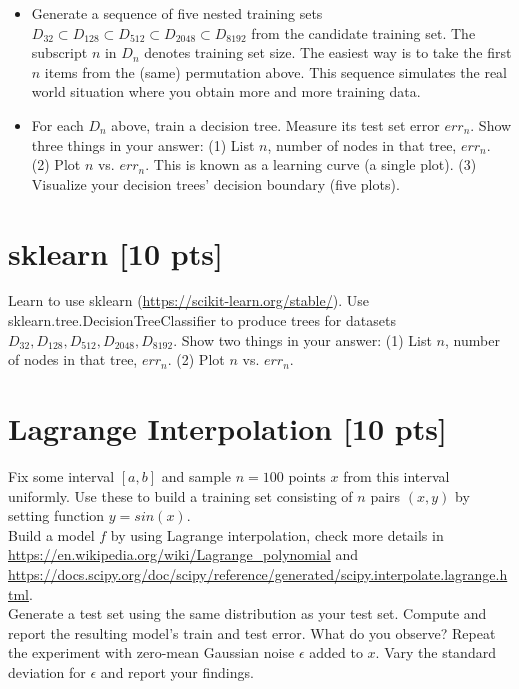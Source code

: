 \documentclass[letter]{article}
\theoremstyle{definition}
\begin{document}
\begin{enumerate}
\begin{itemize}
  \item Generate a sequence of five nested training sets $D_{32} \subset D_{128} \subset D_{512} \subset D_{2048} \subset D_{8192}$ from the candidate training set.  The subscript $n$ in $D_n$ denotes training set size.  The easiest way is to take the first $n$ items from the (same) permutation above.  This sequence simulates the real world situation where you obtain more and more training data.
  
  \item For each $D_n$ above, train a decision tree.  Measure its test set error $err_n$.  Show three things in your answer: (1) List $n$, number of nodes in that tree, $err_n$. (2) Plot $n$ vs. $err_n$.  This is known as a learning curve (a single plot). (3) Visualize your decision trees' decision boundary (five plots). \\
  \end{itemize}
  
\end{enumerate}

\section{sklearn [10 pts]}
Learn to use sklearn (\url{https://scikit-learn.org/stable/}).
Use sklearn.tree.DecisionTreeClassifier to produce trees for datasets $D_{32}, D_{128}, D_{512}, D_{2048}, D_{8192}$.  Show two things in your answer: (1) List $n$, number of nodes in that tree, $err_n$. (2) Plot $n$ vs. $err_n$.

\section{Lagrange Interpolation [10 pts]}
Fix some interval $[a, b]$ and sample $n = 100$ points $x$ from this interval uniformly. Use these to build a training set consisting of $n$ pairs $(x, y)$ by setting function $y = sin(x)$. \\

Build a model $f$ by using Lagrange interpolation, check more details in \url{https://en.wikipedia.org/wiki/Lagrange_polynomial} and \url{https://docs.scipy.org/doc/scipy/reference/generated/scipy.interpolate.lagrange.html}. \\

Generate a test set using the same distribution as your test set. Compute and report the resulting model’s train and test error. What do you observe?
Repeat the experiment with zero-mean Gaussian noise $\epsilon$ added to $x$. Vary the standard deviation for $\epsilon$ and report your findings.


\end{document}
